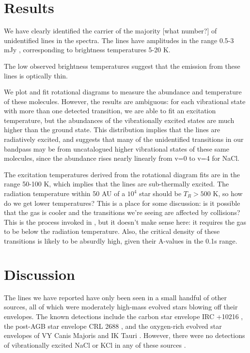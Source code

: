 \documentclass[twocolumn]{aastex62}
\begin{document}
\section{Results}
We have clearly identified the carrier of the majority [what number?]
of unidentified lines in the \citet{Ginsburg2018a} spectra.
The lines have amplitudes in the range 0.5-3 mJy \perbeam, corresponding
to brightness temperatures 5-20 K.

The low observed brightness temperatures suggest that the emission from
these lines is optically thin.


We plot and fit rotational diagrams to measure the abundance and temperature of
these molecules.  However, the results are ambiguous: for each vibrational
state with more than one detected transition, we are able to fit an excitation
temperature, but the abundances of the vibrationally excited states are much
higher than the ground state.  This distribution implies that the lines are
radiatively excited, and suggests that many of the unidentified transitions in
our bandpass may be from uncatalogued higher vibrational states of these same
molecules, since the abundance rises nearly linearly from v=0 to v=4 for NaCl.

The excitation temperatures derived from the rotational diagram fits are in the
range 50-100 K, which implies that the lines are sub-thermally excited.  The
radiation temperature within 50 AU of a $10^4$ \lsun star should be $T_R>500$ K,
so how do we get lower temperatures?
{\color{red} This is a place for some discussion: is it possible that the gas
is cooler and the transitions we're seeing are affected by collisions?
This is the process invoked in \citet{Kaplan2017a}, but it doesn't make sense here:
it requires the gas to be below the radiation temperature.  Also, the critical density
of these transitions is likely to be absurdly high, given their A-values in the 0.1s
range.}

\section{Discussion}
The lines we have reported have only been seen in a small handful of other sources,
all of which were moderately high-mass evolved stars blowing off their envelopes.
The known detections include the carbon star envelope IRC +10216 \citep{Cernicharo1987a},
the post-AGB star envelope CRL 2688 \citep{Highberger2003a}, and the oxygen-rich
evolved star envelopes of VY Canis Majoris and IK Tauri \citep{Milam2007a}.
However, there were no detections of vibrationally excited NaCl or KCl in any
of these sources \citep[][presented the most systematic study of salt
lines, including only v=0 rotational transitions]{Agundez2012a}.
\end{document}
